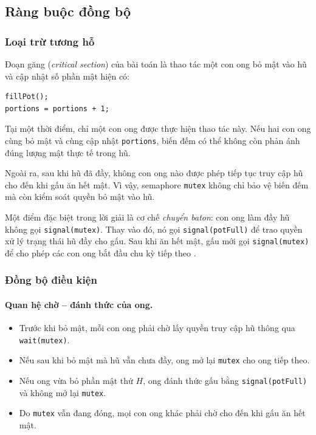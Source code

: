 
\subsection{Ràng buộc đồng bộ}

\subsubsection*{Loại trừ tương hỗ}

Đoạn găng (\textit{critical section}) của bài toán là thao tác một con
ong bỏ mật vào hũ và cập nhật số phần mật hiện có:

\begin{lstlisting}
fillPot();
portions = portions + 1;
\end{lstlisting}

Tại một thời điểm, chỉ một con ong được thực hiện thao tác này. Nếu hai
con ong cùng bỏ mật và cùng cập nhật \texttt{portions}, biến đếm có thể
không còn phản ánh đúng lượng mật thực tế trong hũ.

Ngoài ra, sau khi hũ đã đầy, không con ong nào được phép tiếp tục truy
cập hũ cho đến khi gấu ăn hết mật. Vì vậy, semaphore \texttt{mutex}
không chỉ bảo vệ biến đếm mà còn kiểm soát quyền bỏ mật vào hũ.

Một điểm đặc biệt trong lời giải là cơ chế \textit{chuyển baton}:
con ong làm đầy hũ không gọi \texttt{signal(mutex)}. Thay vào đó, nó
gọi \texttt{signal(potFull)} để trao quyền xử lý trạng thái hũ đầy cho
gấu. Sau khi ăn hết mật, gấu mới gọi \texttt{signal(mutex)} để cho phép
các con ong bắt đầu chu kỳ tiếp theo
\cite[Slides~13--15]{kerola2012}.

\subsubsection*{Đồng bộ điều kiện}

\paragraph{Quan hệ chờ -- đánh thức của ong.}

\begin{itemize}
\item Trước khi bỏ mật, mỗi con ong phải chờ lấy quyền truy cập hũ
thông qua \texttt{wait(mutex)}.
\item Nếu sau khi bỏ mật mà hũ vẫn chưa đầy, ong mở lại
\texttt{mutex} cho ong tiếp theo.
\item Nếu ong vừa bỏ phần mật thứ $H$, ong đánh thức gấu bằng
\texttt{signal(potFull)} và không mở lại \texttt{mutex}.
\item Do \texttt{mutex} vẫn đang đóng, mọi con ong khác phải chờ
cho đến khi gấu ăn hết mật.
\end{itemize}

